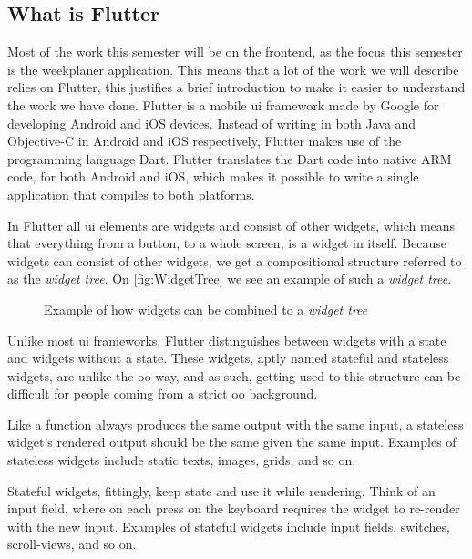 \subsection{What is Flutter}

Most of the work this semester will be on the frontend, as the focus this semester is the weekplaner application. This means that a lot of the work we will describe relies on Flutter, this justifies a brief introduction to make it easier to understand the work we have done. Flutter is a mobile \gls{ui} framework made by Google for developing Android and iOS devices\cite{flutterFAQ}. Instead of writing in both Java and Objective-C in Android and iOS respectively, Flutter makes use of the programming language Dart. Flutter translates the Dart code into native ARM code, for both Android and iOS, which makes it possible to write a single application that compiles to both platforms. 

In Flutter all \gls{ui} elements are widgets and consist of other widgets, which means that everything from a button, to a whole screen, is a widget in itself. Because widgets can consist of other widgets, we get a compositional structure referred to as the \textit{widget tree}. On \autoref{fig:WidgetTree} we see an example of such a \textit{widget tree}.

\begin{figure}[h]
    \centering
    \caption{Example of how widgets can be combined to a \textit{widget tree}}
    \label{fig:WidgetTree}
\end{figure}

Unlike most \gls{ui} frameworks, Flutter distinguishes between widgets with a state and widgets without a state. These widgets, aptly named stateful and stateless widgets, are unlike the \gls{oo} way, and as such, getting used to this structure can be difficult for people coming from a strict \gls{oo} background.

Like a function always produces the same output with the same input, a stateless widget's rendered output should be the same given the same input. Examples of stateless widgets include static texts, images, grids, and so on. 

Stateful widgets, fittingly, keep state and use it while rendering. Think of an input field, where on each press on the keyboard requires the widget to re-render with the new input. Examples of stateful widgets include input fields, switches, scroll-views, and so on.

